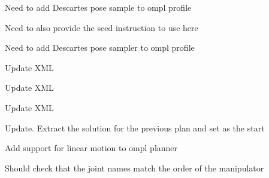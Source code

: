 \begin{DoxyRefList}
%
Need to add Descartes pose sample to ompl profile  
\item[Member \mbox{\hyperlink{classtesseract__planning_1_1OMPLDefaultPlanProfile_afcae926a48950ac684bb0b366b8863f9}{tesseract\+\_\+planning\+::OMPLDefault\+Plan\+Profile\+::apply\+Start\+States}} (\mbox{\hyperlink{structtesseract__planning_1_1OMPLProblem}{OMPLProblem}} \&prob, const Eigen\+::\+Isometry3d \&cartesian\+\_\+waypoint, const \mbox{\hyperlink{structtesseract__planning_1_1InstructionPoly}{Instruction\+Poly}} \&parent\+\_\+instruction, const tesseract\+\_\+common\+::\+Manipulator\+Info \&manip\+\_\+info, const std\+::vector$<$ std\+::string $>$ \&active\+\_\+links, int index) const override]\label{todo__todo000029}%
%
Need to also provide the seed instruction to use here 

\label{todo__todo000028}%
%
Need to add Descartes pose sampler to ompl profile  
\item[Member \mbox{\hyperlink{classtesseract__planning_1_1OMPLDefaultPlanProfile_a46c010d4fcdb918631ac92016d3bfccd}{tesseract\+\_\+planning\+::OMPLDefault\+Plan\+Profile\+::OMPLDefault\+Plan\+Profile}} (const tinyxml2\+::\+XMLElement \&xml\+\_\+element)]\label{todo__todo000025}%
%
Update XML 

\label{todo__todo000026}%
%
Update XML  
\item[Member \mbox{\hyperlink{classtesseract__planning_1_1OMPLDefaultPlanProfile_a9ceeaf8d8a01e483992a71b15cb32df4}{tesseract\+\_\+planning\+::OMPLDefault\+Plan\+Profile\+::to\+XML}} (tinyxml2\+::\+XMLDocument \&doc) const override]\label{todo__todo000030}%
%
Update XML  
\item[Member \mbox{\hyperlink{classtesseract__planning_1_1OMPLMotionPlanner_a26896a1ffb6a331553b3e7dec2af8684}{tesseract\+\_\+planning\+::OMPLMotion\+Planner\+::create\+Problems}} (const \mbox{\hyperlink{structtesseract__planning_1_1PlannerRequest}{Planner\+Request}} \&request) const]\label{todo__todo000023}%
%
Update. Extract the solution for the previous plan and set as the start 

\label{todo__todo000022}%
%
Add support for linear motion to ompl planner 

\label{todo__todo000021}%
%
Should check that the joint names match the order of the manipulator 


\end{DoxyRefList}
